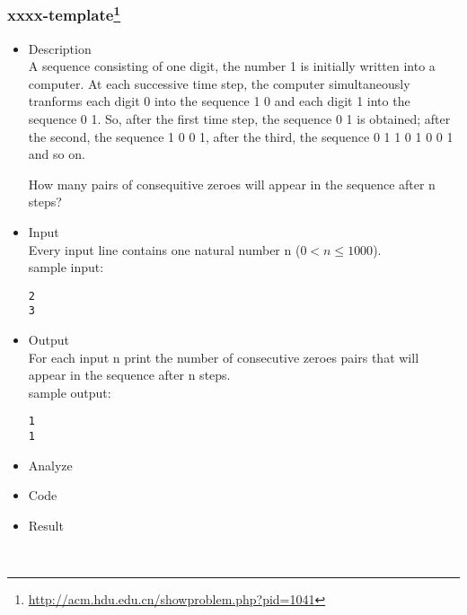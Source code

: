 \clearpage














\subsubsection{xxxx-template\footnote{\url{http://acm.hdu.edu.cn/showproblem.php?pid=1041}} }
\begin{itemize}
\item Description \\
A sequence consisting of one digit, the number 1 is initially written into a computer. At each successive time step, the computer simultaneously tranforms each digit 0 into the sequence 1 0 and each digit 1 into the sequence 0 1. So, after the first time step, the sequence 0 1 is obtained; after the second, the sequence 1 0 0 1, after the third, the sequence 0 1 1 0 1 0 0 1 and so on. 

How many pairs of consequitive zeroes will appear in the sequence after n steps? 
\item Input	\\
Every input line contains one natural number n ($0 < n \leq1 000$).\\
sample input:
\begin{lstlisting}[style=C]
2
3
\end{lstlisting}
\item Output	\\
For each input n print the number of consecutive zeroes pairs that will appear in the sequence after n steps.\\
sample output:
\begin{lstlisting}[style=C]
1
1
\end{lstlisting}
\item Analyze	\\
\item Code	\\
\item Result		\\
\end{itemize}	\\



\clearpage